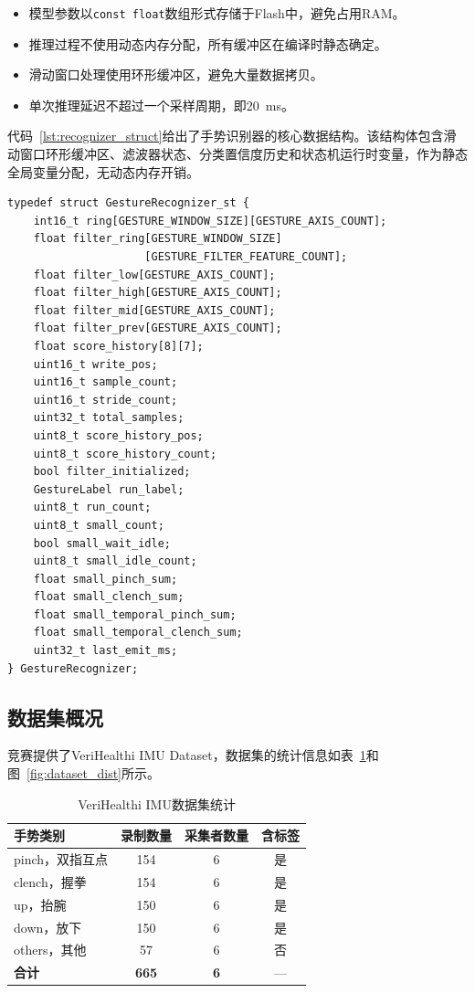 \documentclass[lettersize,journal]{IEEEtran}
\begin{document}
\begin{itemize}[leftmargin=*]
    \item 模型参数以\texttt{const float}数组形式存储于Flash中，避免占用RAM。
    \item 推理过程不使用动态内存分配，所有缓冲区在编译时静态确定。
    \item 滑动窗口处理使用环形缓冲区，避免大量数据拷贝。
    \item 单次推理延迟不超过一个采样周期，即20~ms。
\end{itemize}

代码~\ref{lst:recognizer_struct}给出了手势识别器的核心数据结构。该结构体包含滑动窗口环形缓冲区、滤波器状态、分类置信度历史和状态机运行时变量，作为静态全局变量分配，无动态内存开销。

\begin{lstlisting}[caption={手势识别器核心数据结构（gesture\_algorithm.h）},label={lst:recognizer_struct}]
typedef struct GestureRecognizer_st {
    int16_t ring[GESTURE_WINDOW_SIZE][GESTURE_AXIS_COUNT];
    float filter_ring[GESTURE_WINDOW_SIZE]
                     [GESTURE_FILTER_FEATURE_COUNT];
    float filter_low[GESTURE_AXIS_COUNT];
    float filter_high[GESTURE_AXIS_COUNT];
    float filter_mid[GESTURE_AXIS_COUNT];
    float filter_prev[GESTURE_AXIS_COUNT];
    float score_history[8][7];
    uint16_t write_pos;
    uint16_t sample_count;
    uint16_t stride_count;
    uint32_t total_samples;
    uint8_t score_history_pos;
    uint8_t score_history_count;
    bool filter_initialized;
    GestureLabel run_label;
    uint8_t run_count;
    uint8_t small_count;
    bool small_wait_idle;
    uint8_t small_idle_count;
    float small_pinch_sum;
    float small_clench_sum;
    float small_temporal_pinch_sum;
    float small_temporal_clench_sum;
    uint32_t last_emit_ms;
} GestureRecognizer;
\end{lstlisting}

\subsection{数据集概况}

竞赛提供了VeriHealthi IMU Dataset，数据集的统计信息如表~\ref{tab:dataset_stat}和图~\ref{fig:dataset_dist}所示。

\begin{table}[htbp]
    \centering
    \caption{VeriHealthi IMU数据集统计}
    \label{tab:dataset_stat}
    \begin{tabular}{lccc}
        \toprule
        \textbf{手势类别} & \textbf{录制数量} & \textbf{采集者数量} & \textbf{含标签} \\
        \midrule
        pinch，双指互点 & 154 & 6 & 是 \\
        clench，握拳   & 154 & 6 & 是 \\
        up，抬腕       & 150 & 6 & 是 \\
        down，放下     & 150 & 6 & 是 \\
        others，其他   & 57  & 6 & 否 \\
        \midrule
        \textbf{合计}   & \textbf{665} & \textbf{6} & — \\
        \bottomrule
    \end{tabular}
\end{table}
\end{document}
